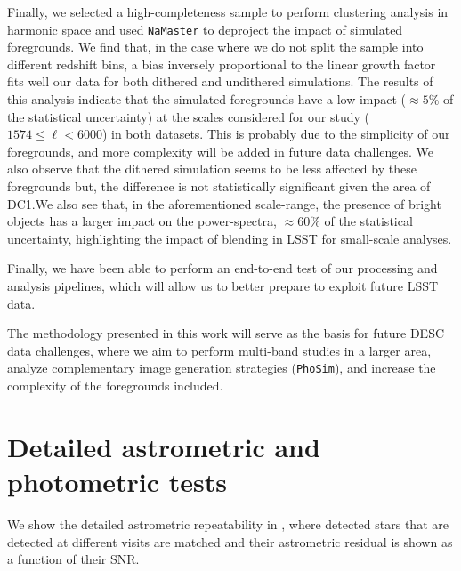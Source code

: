 \documentclass[twocolumn]{aastex62}
\begin{document}
Finally, we selected a high-completeness sample to perform clustering analysis in harmonic space and used \texttt{NaMaster} to deproject the impact of simulated foregrounds. We find that, in the case where we do not split the sample into different redshift bins, a bias inversely proportional to the linear growth factor fits well our data for both dithered and undithered simulations. The results of this analysis indicate that the simulated foregrounds have a low impact ($\approx 5\%$ of the statistical uncertainty) at the scales considered for our study ($1574 \leq \ell < 6000$) in both datasets. This is probably due to the simplicity of our foregrounds, and more complexity will be added in future data challenges. We also observe that the dithered simulation seems to be less affected by these foregrounds but, the difference is not statistically significant given the area of DC1.We also see that, in the aforementioned scale-range, the presence of bright objects has a larger impact on the power-spectra, $\approx 60\%$ of the statistical uncertainty, highlighting the impact of blending in LSST for small-scale analyses.

Finally, we have been able to perform an end-to-end test of our processing and analysis pipelines, which will allow us to better prepare to exploit future LSST data.

The methodology presented in this work will serve as the basis for future DESC data challenges, where we aim to perform multi-band studies in a larger area, analyze complementary image generation strategies (\texttt{PhoSim}), and increase the complexity of the foregrounds included.

\appendix
\section{Detailed astrometric and photometric tests}

We show the detailed astrometric repeatability in , where detected stars that are detected at different visits are matched and their astrometric residual is shown as a function of their SNR.
\end{document}
